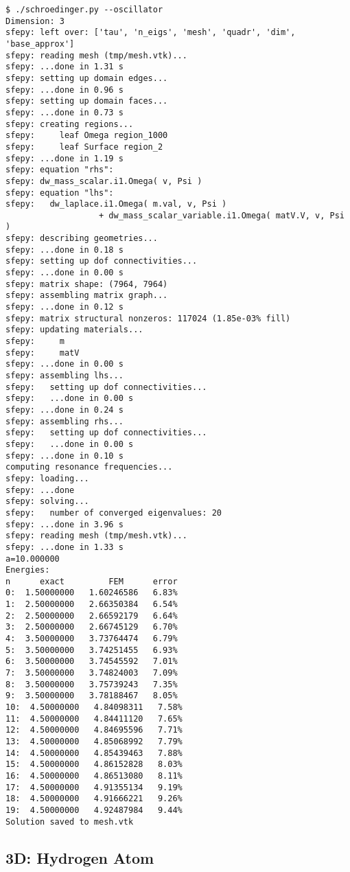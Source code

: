 \begin{lstlisting}
$ ./schroedinger.py --oscillator
Dimension: 3
sfepy: left over: ['tau', 'n_eigs', 'mesh', 'quadr', 'dim', 'base_approx']
sfepy: reading mesh (tmp/mesh.vtk)...
sfepy: ...done in 1.31 s
sfepy: setting up domain edges...
sfepy: ...done in 0.96 s
sfepy: setting up domain faces...
sfepy: ...done in 0.73 s
sfepy: creating regions...
sfepy:     leaf Omega region_1000
sfepy:     leaf Surface region_2
sfepy: ...done in 1.19 s
sfepy: equation "rhs":
sfepy: dw_mass_scalar.i1.Omega( v, Psi )
sfepy: equation "lhs":
sfepy:   dw_laplace.i1.Omega( m.val, v, Psi )
                   + dw_mass_scalar_variable.i1.Omega( matV.V, v, Psi )
sfepy: describing geometries...
sfepy: ...done in 0.18 s
sfepy: setting up dof connectivities...
sfepy: ...done in 0.00 s
sfepy: matrix shape: (7964, 7964)
sfepy: assembling matrix graph...
sfepy: ...done in 0.12 s
sfepy: matrix structural nonzeros: 117024 (1.85e-03% fill)
sfepy: updating materials...
sfepy:     m
sfepy:     matV
sfepy: ...done in 0.00 s
sfepy: assembling lhs...
sfepy:   setting up dof connectivities...
sfepy:   ...done in 0.00 s
sfepy: ...done in 0.24 s
sfepy: assembling rhs...
sfepy:   setting up dof connectivities...
sfepy:   ...done in 0.00 s
sfepy: ...done in 0.10 s
computing resonance frequencies...
sfepy: loading...
sfepy: ...done
sfepy: solving...
sfepy:   number of converged eigenvalues: 20
sfepy: ...done in 3.96 s
sfepy: reading mesh (tmp/mesh.vtk)...
sfepy: ...done in 1.33 s
a=10.000000
Energies:
n      exact         FEM      error
0:  1.50000000   1.60246586   6.83%
1:  2.50000000   2.66350384   6.54%
2:  2.50000000   2.66592179   6.64%
3:  2.50000000   2.66745129   6.70%
4:  3.50000000   3.73764474   6.79%
5:  3.50000000   3.74251455   6.93%
6:  3.50000000   3.74545592   7.01%
7:  3.50000000   3.74824003   7.09%
8:  3.50000000   3.75739243   7.35%
9:  3.50000000   3.78188467   8.05%
10:  4.50000000   4.84098311   7.58%
11:  4.50000000   4.84411120   7.65%
12:  4.50000000   4.84695596   7.71%
13:  4.50000000   4.85068992   7.79%
14:  4.50000000   4.85439463   7.88%
15:  4.50000000   4.86152828   8.03%
16:  4.50000000   4.86513080   8.11%
17:  4.50000000   4.91355134   9.19%
18:  4.50000000   4.91666221   9.26%
19:  4.50000000   4.92487984   9.44%
Solution saved to mesh.vtk
\end{lstlisting}

\subsection{3D: Hydrogen Atom}

